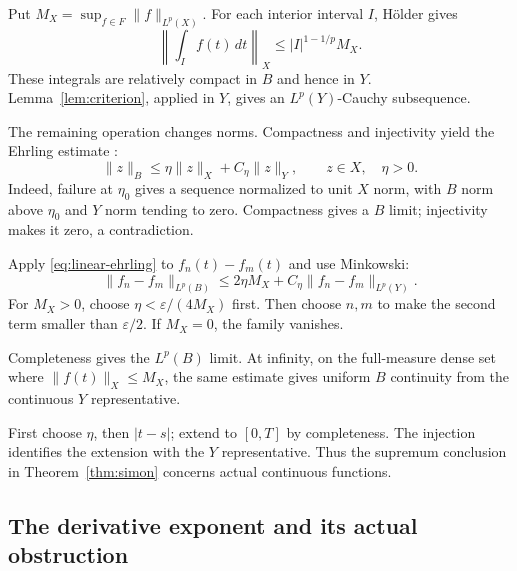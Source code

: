 \documentclass[12pt,reqno]{amsart}
\begin{document}
Put $M_X=\sup_{f\in F}\|f\|_{L^p(X)}$. For each interior interval $I$, H\"older gives
\[
\left\|\int_I f(t)\,dt\right\|_X\le |I|^{1-1/p}M_X.
\]
These integrals are relatively compact in $B$ and hence in $Y$. Lemma~\ref{lem:criterion}, applied in $Y$, gives an $L^p(Y)$-Cauchy subsequence.

The remaining operation changes norms. Compactness and injectivity yield the Ehrling estimate \cite[Lemma 8, pp.~84--85]{S-simon}:
\begin{equation}\label{eq:linear-ehrling}
\|z\|_B\le\eta\|z\|_X+C_\eta\|z\|_Y,\qquad z\in X,\quad\eta>0.
\end{equation}
Indeed, failure at $\eta_0$ gives a sequence normalized to unit $X$ norm, with $B$ norm above $\eta_0$ and $Y$ norm tending to zero. Compactness gives a $B$ limit; injectivity makes it zero, a contradiction.

Apply \eqref{eq:linear-ehrling} to $f_n(t)-f_m(t)$ and use Minkowski:
\begin{equation}\label{eq:linear-upgrade}
\|f_n-f_m\|_{L^p(B)}
\le2\eta M_X+C_\eta\|f_n-f_m\|_{L^p(Y)}.
\end{equation}
For $M_X>0$, choose $\eta<\varepsilon/(4M_X)$ first. Then choose $n,m$ to make the second term smaller than $\varepsilon/2$. If $M_X=0$, the family vanishes.

Completeness gives the $L^p(B)$ limit. At infinity, on the full-measure dense set where $\|f(t)\|_X\le M_X$, the same estimate gives uniform $B$ continuity from the continuous $Y$ representative.

First choose $\eta$, then $|t-s|$; extend to $[0,T]$ by completeness. The injection identifies the extension with the $Y$ representative. Thus the supremum conclusion in Theorem~\ref{thm:simon} concerns actual continuous functions.
\subsection{The derivative exponent and its actual obstruction}
\end{document}

